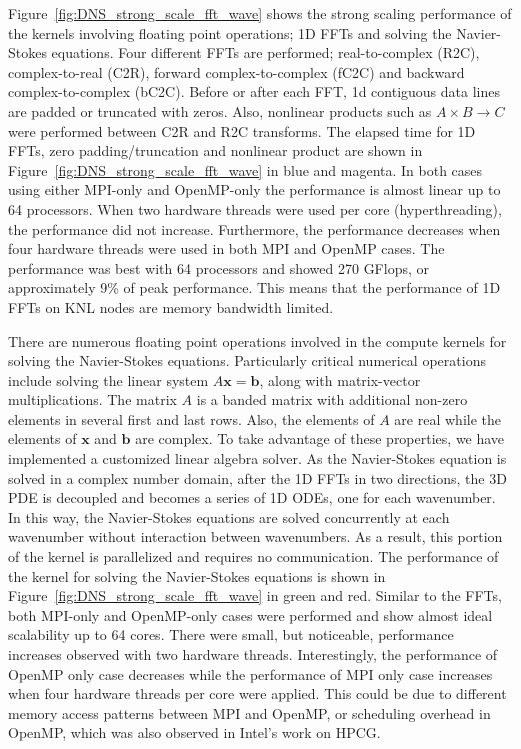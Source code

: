 Figure~\ref{fig:DNS_strong_scale_fft_wave} shows the strong scaling performance
of the kernels involving floating point operations; 1D FFTs and solving the
Navier-Stokes equations. Four different FFTs are performed; real-to-complex
(R2C), complex-to-real (C2R), forward complex-to-complex (fC2C) and backward
complex-to-complex (bC2C). Before or after each FFT, 1d contiguous data lines
are padded or truncated with zeros.  Also, nonlinear products such as $A\times
B \rightarrow C$ were performed between C2R and R2C transforms. The elapsed
time for 1D FFTs, zero padding/truncation and nonlinear product are shown in
Figure~\ref{fig:DNS_strong_scale_fft_wave} in blue and magenta. In both cases
using either MPI-only and OpenMP-only the performance is almost linear up to 64
processors. When two hardware threads were used per core (hyperthreading), the
performance did not increase. Furthermore, the performance decreases when four
hardware threads were used in both MPI and OpenMP cases. The performance was
best with 64 processors and showed 270 GFlops, or approximately 9\% of peak
performance. This means that the performance of 1D FFTs on KNL nodes are memory
bandwidth limited.

There are numerous floating point operations involved in the compute
kernels for solving the Navier-Stokes equations.
Particularly critical numerical operations include solving the linear system
$A \textbf{x} = \textbf{b}$, along with
matrix-vector multiplications. The matrix $A$ is a banded matrix with
additional non-zero elements in several first and last rows. Also, the
elements of $A$ are real while the elements of $\textbf{x}$ and
$\textbf{b}$ are complex. To take advantage of these properties, we have
implemented a customized linear algebra solver. As the Navier-Stokes
equation is solved in a complex number domain, after the 1D FFTs in two
directions, the 3D PDE is decoupled and becomes a series of 1D ODEs, one
for each wavenumber. In this way, the
Navier-Stokes equations are solved concurrently at each wavenumber without
interaction between wavenumbers. As a result, this portion of the kernel
is parallelized and requires no communication. The performance of
the kernel for solving the Navier-Stokes equations is shown in
Figure~\ref{fig:DNS_strong_scale_fft_wave} in green and red. Similar to
the FFTs, both MPI-only and OpenMP-only cases were performed and show
almost ideal scalability up to 64 cores.
There were small, but noticeable, performance increases
observed with two hardware threads. Interestingly, the performance of
OpenMP only case decreases while the performance of MPI only case
increases when four hardware threads per core were applied. This could be
due to different memory access patterns between MPI and OpenMP,
or scheduling overhead in OpenMP, which was also observed in Intel's work on
HPCG\cite{Park:2014:ESI:2683593.2683696}.

